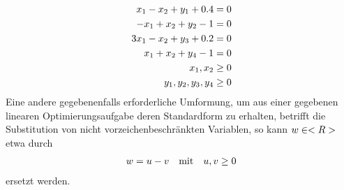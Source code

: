 \begin{example}
\begin{align}
		x_1-x_2+y_1+0.4 &= 0 \notag \\
		-x_1+x_2+y_2-1 &= 0 \notag \\
		3x_1-x_2+y_3+0.2 &= 0\notag \\
		x_1+x_2+y_4-1 &= 0\notag \\
		x_1,x_2 &\ge 0\notag \\
		y_1,y_2,y_3,y_4 &\ge 0 \notag
	\end{align}
	Eine andere gegebenenfalls erforderliche Umformung, um aus einer gegebenen linearen Optimierungsaufgabe deren Standardform zu erhalten, betrifft die Substitution von nicht vorzeichenbeschränkten Variablen, so kann $w\in<R>$ etwa durch
	\begin{align}
		w = u-v\quad\text{mit}\quad u,v\ge 0\notag
	\end{align}
	ersetzt werden.
\end{example}
